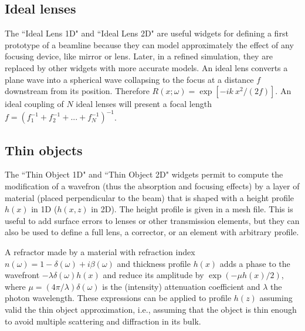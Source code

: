 \documentclass{iopconfser}
\begin{document}
\subsection{Ideal lenses}
The ``Ideal Lens 1D" and ``Ideal Lens 2D" are useful widgets for defining a first prototype of a beamline because they can model approximately the effect of any focusing device, like mirror or lens. Later, in a refined simulation, they are replaced by other widgets with more accurate models. 
An ideal lens converts a plane wave into a spherical wave collapsing to the focus at a distance $f$ downstream from its position.
Therefore $R(x;\omega) = \exp[-i k~x^2/(2 f)]$.
An ideal coupling of $N$ ideal lenses will present a focal length $f=(f_1^{-1}+f_2^{-1}+...+f_N^{-1})^{-1}$. 

\subsection{Thin objects}\label{sec:thinobject} 
The ``Thin Object 1D" and ``Thin Object 2D" widgets permit to compute the modification of a wavefron (thus the absorption and focusing effects) by a layer of material (placed perpendicular to the beam) that is shaped with a height profile $h(x)$ in 1D ($h(x,z)$ in 2D). The height profile is given in a mesh file. This is useful to add surface errors to lenses or other transmission elements, but they can also be used to define a full lens, a corrector, or an element with arbitrary profile.    

A refractor made by a material with refraction index $n(\omega)=1-\delta(\omega)+i\beta(\omega)$ 
and thickness profile $h(x)$ adds a phase to the wavefront $-\lambda \delta(\omega) h(x)$ and reduce its amplitude by $\exp(-\mu h(x)/2)$, where $\mu=(4 \pi/\lambda) \delta(\omega)$ is the (intensity) attenuation coefficient and $\lambda$ the photon wavelength. These expressions can be applied to profile $h(z)$ assuming valid the thin object approximation, i.e., assuming that the object is thin enough to avoid multiple scattering and diffraction in its bulk. 

\end{document}
